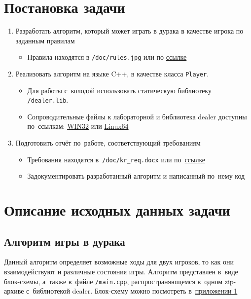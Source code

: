 \documentclass[a4paper,12pt]{article}
\begin{document}
    \section{Постановка задачи}
        \begin{enumerate}
            \item Разработать алгоритм, который может играть в дурака в качестве игрока по заданным правилам
            \begin{itemize}
                \item Правила находятся в \texttt{/doc/rules.jpg} или по \href{http://13633-oop.mooo.com/files/durak.docx}{ссылке}
            \end{itemize}
			\item Реализовать алгоритм на языке C++, в качестве класса \texttt{Player}.
            \begin{itemize}
                \item Для работы с~колодой использовать статическую библиотеку \texttt{/dealer.lib}.
                \item Сопроводительные файлы к лабораторной и библиотека \textsf{dealer} доступны по~ссылкам: \href{http://13633-oop.mooo.com/files/dealer\_vs2019.zip}{WIN32} или \href{http://13633-oop.mooo.com/files/dealer\_x86\_64.zip}{Linux64}
            \end{itemize}
            \item Подготовить отчёт по~работе, соответствующий требованиям
            \begin{itemize}
                \item Требования находятся в~\texttt{/doc/kr\_req.docx} или по~\href{http://13633-oop.mooo.com/files/kr\_req.docx}{ссылке}
                \item Задокументировать разработанный алгоритм и написанный по~нему код
            \end{itemize}
        \end{enumerate}

    \section{Описание исходных данных задачи}

    \subsection{Алгоритм игры в дурака}
        Данный алгоритм определяет возможные ходы для двух игроков, то как они взаимодействуют и различные состояния игры.
        Алгоритм представлен в~виде блок-схемы, а~также в~файле \texttt{/main.cpp},
        распространяющемся в~одном zip-архиве с~библиотекой dealer.
        Блок-схему можно посмотреть в~\hyperlink{rulesimg}{приложении 1}
\end{document}
